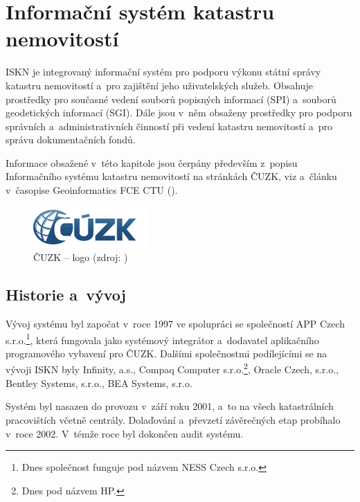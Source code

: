 \documentclass[a4paper,12pt,oneside]{book}
\begin{document}
\clearpage
\chapter{Informační systém katastru nemovitostí}
\label{l_iskn}

ISKN je integrovaný informační systém pro podporu výkonu státní správy
katastru nemovitostí a~pro zajištění jeho uživatelských
služeb. Obsahuje prostředky pro současné vedení souborů popisných
informací (SPI) a~souborů geodetických informací (SGI). Dále jsou
v~něm obsaženy prostředky pro podporu správních a~administrativních
činností při vedení katastru nemovitostí a~pro správu dokumentačních
fondů. 

Informace obsažené v~této kapitole jsou čerpány především z~popisu 
Informačního systému katastru nemovitostí na stránkách ČUZK, viz \cite{iskn}
a~článku v~časopise Geoinformatics FCE CTU (\cite{geoinformatics_katastr}).

\begin{figure}[htb]
\centering
\includegraphics[scale=1]{images/cuzk-logo.png}
\caption[ČUZK -- logo]{ČUZK -- logo (zdroj: \cite{iskn})}
\end{figure}

\section{Historie a~vývoj}

Vývoj systému byl započat v~roce 1997 ve spolupráci se společností APP
Czech s.r.o.\footnote{Dnes společnost funguje pod názvem NESS Czech
  s.r.o.}, která fungovala jako systémový integrátor a~dodavatel
aplikačního programového vybavení pro ČUZK. Dalšími společnostmi podílejícími
se na vývoji ISKN byly Infinity, a.s., Compaq Computer
s.r.o.\footnote{Dnes pod názvem HP.}, Oracle Czech, s.r.o., Bentley
Systems, s.r.o., BEA Systems, s.r.o.

Systém byl nasazen do provozu v~září roku 2001, a~to na všech
katastrálních pracovištích včetně centrály. Dolaďování a~převzetí
závěrečných etap probíhalo v~roce 2002. V~témže roce byl dokončen
audit systému.
\end{document}
